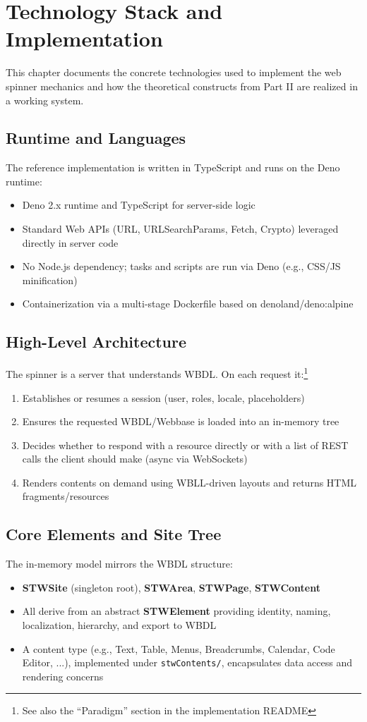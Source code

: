 \chapter{Technology Stack and Implementation}
\label{chap:implementation-tech}

This chapter documents the concrete technologies used to implement the web spinner mechanics and how the theoretical constructs from Part II are realized in a working system.

\section{Runtime and Languages}
The reference implementation is written in TypeScript and runs on the Deno runtime:
\begin{itemize}
	\item Deno 2.x runtime and TypeScript for server-side logic
	\item Standard Web APIs (URL, URLSearchParams, Fetch, Crypto) leveraged directly in server code
	\item No Node.js dependency; tasks and scripts are run via Deno (e.g., CSS/JS minification)
	\item Containerization via a multi-stage Dockerfile based on denoland/deno:alpine
\end{itemize}

\section{High-Level Architecture}
The spinner is a server that understands WBDL. On each request it:\footnote{See also the ``Paradigm'' section in the implementation README}
\begin{enumerate}
	\item Establishes or resumes a session (user, roles, locale, placeholders)
	\item Ensures the requested WBDL/Webbase is loaded into an in-memory tree
	\item Decides whether to respond with a resource directly or with a list of REST calls the client should make (async via WebSockets)
	\item Renders contents on demand using WBLL-driven layouts and returns HTML fragments/resources
\end{enumerate}

\section{Core Elements and Site Tree}
The in-memory model mirrors the WBDL structure:
\begin{itemize}
	\item \textbf{STWSite} (singleton root), \textbf{STWArea}, \textbf{STWPage}, \textbf{STWContent}
	\item All derive from an abstract \textbf{STWElement} providing identity, naming, localization, hierarchy, and export to WBDL
	\item A content type (e.g., Text, Table, Menus, Breadcrumbs, Calendar, Code Editor, ...), implemented under \texttt{stwContents/}, encapsulates data access and rendering concerns
\end{itemize}

